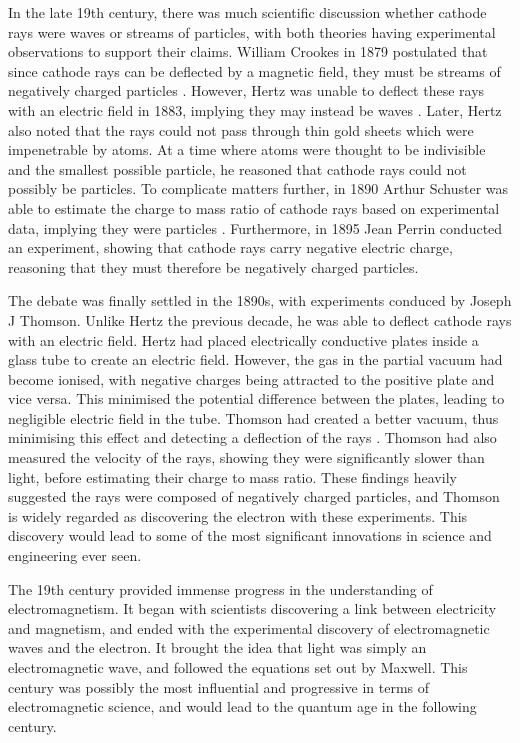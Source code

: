 In the late 19th century, there was much scientific discussion whether cathode rays were waves or streams of particles, with both theories having experimental observations to support their claims. William Crookes in 1879 postulated that since cathode rays can be deflected by a magnetic field, they must be streams of negatively charged particles \cite{Davis2007}. However, Hertz was unable to deflect these rays with an electric field in 1883, implying they may instead be waves \cite{Davis2007,Arabatzis2009}. Later, Hertz also noted that the rays could not pass through thin gold sheets which were impenetrable by atoms. At a time where atoms were thought to be indivisible and the smallest possible particle, he reasoned that cathode rays could not possibly be particles. To complicate matters further, in 1890 Arthur Schuster was able to estimate the charge to mass ratio of cathode rays based on experimental data, implying they were particles \cite{Arabatzis2009}. Furthermore, in 1895 Jean Perrin conducted an experiment, showing that cathode rays carry negative electric charge, reasoning that they must therefore be negatively charged particles.

The debate was finally settled in the 1890s, with experiments conduced by Joseph J Thomson. Unlike Hertz the previous decade, he was able to deflect cathode rays with an electric field. Hertz had placed electrically conductive plates inside a glass tube to create an electric field. However, the gas in the partial vacuum had become ionised, with negative charges being attracted to the positive plate and vice versa. This minimised the potential difference between the plates, leading to negligible electric field in the tube. Thomson had created a better vacuum, thus minimising this effect and detecting a deflection of the rays \cite{Davis2007}. Thomson had also measured the velocity of the rays, showing they were significantly slower than light, before estimating their charge to mass ratio. These findings heavily suggested the rays were composed of negatively charged particles, and Thomson is widely regarded as discovering the electron with these experiments. This discovery would lead to some of the most significant innovations in science and engineering ever seen.

The 19th century provided immense progress in the understanding of electromagnetism. It began with scientists discovering a link between electricity and magnetism, and ended with the experimental discovery of electromagnetic waves and the electron. It brought the idea that light was simply an electromagnetic wave, and followed the equations set out by Maxwell. This century was possibly the most influential and progressive in terms of electromagnetic science, and would lead to the quantum age in the following century.

